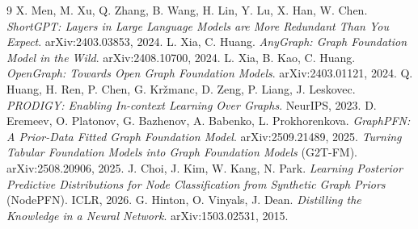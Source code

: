 \documentclass[12pt,a4paper]{article}
\begin{document}
\begin{thebibliography}{9}
 X. Men, M. Xu, Q. Zhang, B. Wang, H. Lin, Y. Lu, X. Han, W. Chen. \emph{ShortGPT: Layers in Large Language Models are More Redundant Than You Expect}. arXiv:2403.03853, 2024.
 L. Xia, C. Huang. \emph{AnyGraph: Graph Foundation Model in the Wild}. arXiv:2408.10700, 2024.
 L. Xia, B. Kao, C. Huang. \emph{OpenGraph: Towards Open Graph Foundation Models}. arXiv:2403.01121, 2024.
 Q. Huang, H. Ren, P. Chen, G. Kržmanc, D. Zeng, P. Liang, J. Leskovec. \emph{PRODIGY: Enabling In-context Learning Over Graphs}. NeurIPS, 2023.
 D. Eremeev, O. Platonov, G. Bazhenov, A. Babenko, L. Prokhorenkova. \emph{GraphPFN: A Prior-Data Fitted Graph Foundation Model}. arXiv:2509.21489, 2025.
 \emph{Turning Tabular Foundation Models into Graph Foundation Models} (G2T-FM). arXiv:2508.20906, 2025. %
 J. Choi, J. Kim, W. Kang, N. Park. \emph{Learning Posterior Predictive Distributions for Node Classification from Synthetic Graph Priors} (NodePFN). ICLR, 2026.
 G. Hinton, O. Vinyals, J. Dean. \emph{Distilling the Knowledge in a Neural Network}. arXiv:1503.02531, 2015.
\end{thebibliography}
\end{document}
